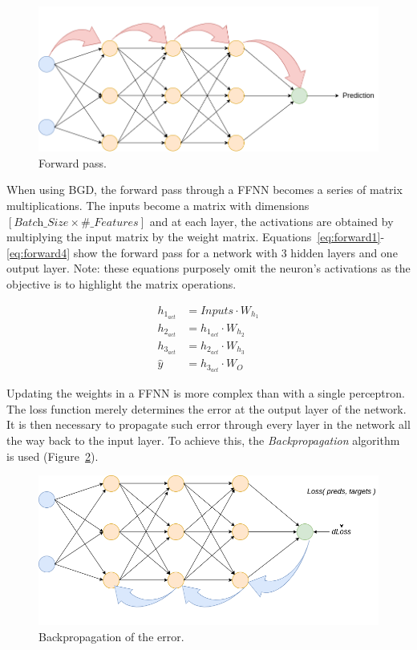 \begin{figure}[!htbp]
    \centering
    \includegraphics[width=.5\textwidth]{Images/forward_pass.png}
    \caption{Forward pass.}
    \label{fig:forward}
\end{figure}

When using BGD, the forward pass through a FFNN becomes a series of matrix
multiplications. The inputs become a matrix with dimensions $[\textit{Batch\_Size} \times
\textit{\#\_Features}]$ and at each layer, the activations are obtained by multiplying
the input matrix by the weight matrix.
Equations~\ref{eq:forward1}-\ref{eq:forward4} show the forward pass for a
network with 3 hidden layers and one output layer. Note: these equations
purposely omit the neuron's activations as the objective is to highlight the
matrix operations.

\begin{align}
    h_{1_{act}} &= \textit{Inputs} \cdot W_{h_1} \label{eq:forward1}\\
    h_{2_{\textit{act}}} &= h_{1_{\textit{act}}} \cdot W_{h_2} \label{eq:forward2}\\
    h_{3_{\textit{act}}} &= h_{2_{\textit{act}}} \cdot W_{h_3} \label{eq:forward3}\\
    \hat{y} &= h_{3_{\textit{act}}} \cdot W_{O}
    \label{eq:forward4}
\end{align}

Updating the weights in a FFNN is more complex than with a single perceptron.
The loss function merely determines the error at the output layer of the
network. It is then necessary to propagate such error through every layer in the
network all the way back to the input layer. To achieve this, the
\textit{Backpropagation} algorithm~\cite{backprop} is used (Figure~\ref{fig:backprop}).

\begin{figure}[!htbp]
    \centering
    \includegraphics[width=.5\textwidth]{Images/backprop.png}
    \caption{Backpropagation of the error.}
    \label{fig:backprop}
\end{figure}

